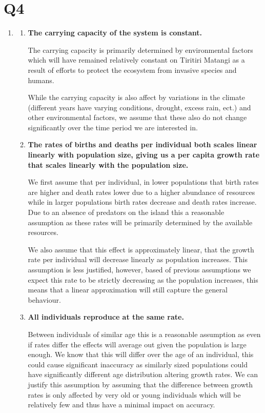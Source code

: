 \documentclass[a4paper, 11pt]{article}
\begin{document}
\section*{Q4}
\begin{enumerate}[label=(\alph*)]
  \item \begin{enumerate}[label=(\Roman*)]
    \item \textbf{The carrying capacity of the system is constant.}
    
    The carrying capacity is primarily determined by environmental factors which will have remained relatively constant on Tiritiri Matangi as a result of efforts to protect the ecosystem from invasive species and humans. 
    
    While the carrying capacity is also affect by variations in the climate (different years have varying conditions, drought, excess rain, ect.) and other environmental factors, we assume that these also do not change significantly over the time period we are interested in. 
    
    \item \textbf{The rates of births and deaths per individual both scales linear linearly with population size, giving us a per capita growth rate that scales linearly with the population size. }  
    
    We first assume that per individual, in lower populations that birth rates are higher and death rates lower due to a higher abundance of resources while in larger populations birth rates decrease and death rates increase. Due to an absence of predators on the island this a reasonable assumption as these rates will be primarily determined by the available resources. 

    We also assume that this effect is approximately linear, that the growth rate per individual will decrease linearly as population increases. This assumption is less justified, however, based of previous assumptions we expect this rate to be strictly decreasing as the population increases, this means that a linear approximation will still capture the general behaviour. 
    

    \item \textbf{All individuals reproduce at the same rate.  }
    
    Between individuals of similar age this is a reasonable assumption as even if rates differ the effects will average out given the population is large enough. We know that this will differ over the age of an individual, this could cause significant inaccuracy as similarly sized populations could have significantly different age distribution altering growth rates. We can justify this assumption by assuming that the difference between growth rates is only affected by very old or young individuals which will be relatively few and thus have a minimal impact on accuracy. 


\end{enumerate}
\end{enumerate}
\end{document}
